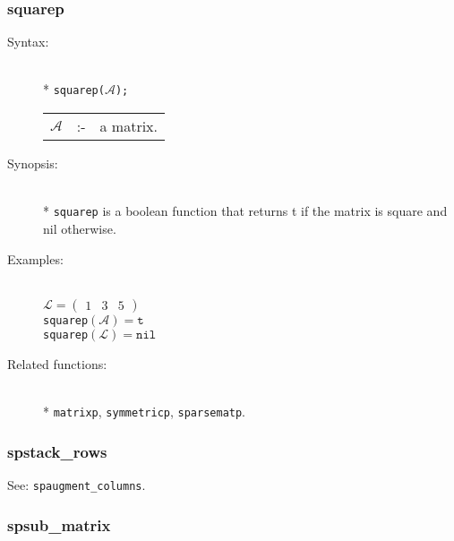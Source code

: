 \subsubsection{squarep}
\label{sparse:squarep}

\begin{description}
\item[Syntax:]\mbox{}\\*
\texttt{squarep($\mathcal{A}$);}\\[2mm]
\begin{tabular}{l l l}
$\mathcal{A}$ &:-& a matrix.
\end{tabular}

\item[Synopsis:]\mbox{}\\*
\texttt{squarep} is a boolean function that returns t if
                the matrix is square and nil otherwise.

\item[Examples:]\mbox{}\\
\(\mathcal{L} = \begin{pmatrix} 1 & 3 & 5 \end{pmatrix}\) \\[2mm]
\texttt{squarep}\((\mathcal{A}) = \texttt{t}\) \\[2mm]
\texttt{squarep}\((\mathcal{L}) = \texttt{nil}\)

\item[Related functions:]\mbox{}\\*
\texttt{matrixp}, \texttt{symmetricp}, \texttt{sparsematp}.
\end{description}


\subsubsection{spstack\_rows}
\label{sparse:spstack_rows}

See: \texttt{spaugment\_columns}.


\subsubsection{spsub\_matrix}
\label{sparse:spsub_matrix}

